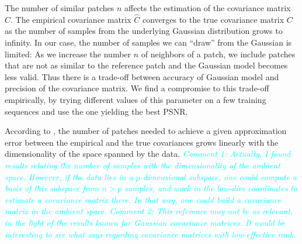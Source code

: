 \documentclass[10pt, journal, twocolumn, final, a4paper]{IEEEtran}
\newcommand{\pa}[1]{\textcolor{cyan}{#1}}
\newcommand{\pcomment}[1]{\textit{\pa{#1}}}
\begin{document}
The number of similar patches $n$ affects the estimation of the covariance
matrix $C$.
The empirical covariance matrix $\widehat C$ converges to the true covariance matrix
$C$ as the number of samples from the underlying Gaussian distribution grows to infinity.
In our case, the number of samples we can ``draw'' from the Gaussian is limited:
As we increase the number $n$ of neighbors of a patch, we include patches
that are not as similar to the reference patch and the Gaussian model becomes less valid. 
%
Thus there is a trade-off between accuracy of Gaussian model and precision of the
covariance matrix.
We find a compromise to this trade-off empirically, by trying different values of this parameter on a 
few training sequences and use the one yielding the best PSNR.

According to \cite{Vershynin2012}, the number of patches needed to achieve a given approximation
error between the empirical and the true covariances grows linearly with the
dimensionality of the space spanned by the data. 
\pcomment{Comment 1: Actually, I found results relating the number of samples with
the dimensionality of the ambient space. 
However, if the data lies in a $p$-dimensional subspace, one could 
compute a basis of this subspace from $n > p$ samples, and work in the low-dim
coordinates to estimate a covariance matrix there. In that way, one could build
a covariance matrix in the ambient space.}
\pcomment{Comment 2: This reference may not be as relevant, in the light of the 
results known for Gaussian covariance matrices. It would be interesting to see what 
\cite{bunea2015} says regarding covariance matrices with low-effective rank.}
\end{document}
